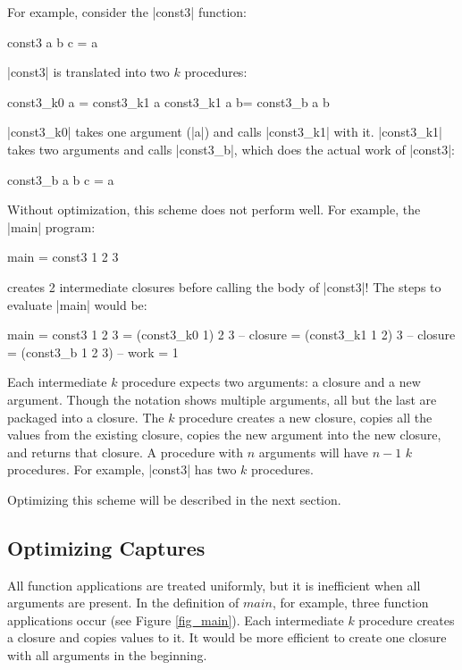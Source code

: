 \documentclass[11pt]{article}
\begin{document}
For example, consider the |const3| function:

\begin{code}
const3 a b c = a
\end{code}

|const3| is translated into two $k$ procedures:

\begin{code}
  const3_k0 a = const3_k1 a
  const3_k1 a b= const3_b a b
\end{code}

|const3_k0| takes one argument (|a|) and calls |const3_k1| with it. |const3_k1| takes
two arguments and calls |const3_b|, which does the actual work of |const3|:

\begin{code}
  const3_b a b c = a
\end{code}

Without optimization, this scheme does not perform well. For example, the |main| program:

\begin{code}
  main = const3 1 2 3 
\end{code}

creates 2 intermediate closures before calling the body of |const3|!
The steps to evaluate |main| would be:

\begin{code}
main = const3 1 2 3
     = (const3_k0 1) 2 3 -- closure
     = (const3_k1 1 2) 3 -- closure
     = (const3_b 1 2 3)  -- work
     = 1
\end{code}

Each intermediate $k$ procedure expects two arguments: a closure and a
new argument. Though the notation shows multiple arguments, all but
the last are packaged into a closure. The $k$ procedure creates a new
closure, copies all the values from the existing closure, copies the
new argument into the new closure, and returns that closure. A procedure
with $n$ arguments will have $n - 1$ $k$ procedures. For example, |const3|
has two $k$ procedures. 

Optimizing this scheme will be described in the next section.

\subsection*{Optimizing Captures}

All function applications are treated uniformly, but it is inefficient
when all arguments are present. In the definition of $main$, for
example, three function applications occur (see Figure
\ref{fig_main}). Each intermediate $k$ procedure creates a closure and
copies values to it.  It would be more efficient to create one closure
with all arguments in the beginning.
\end{document}
